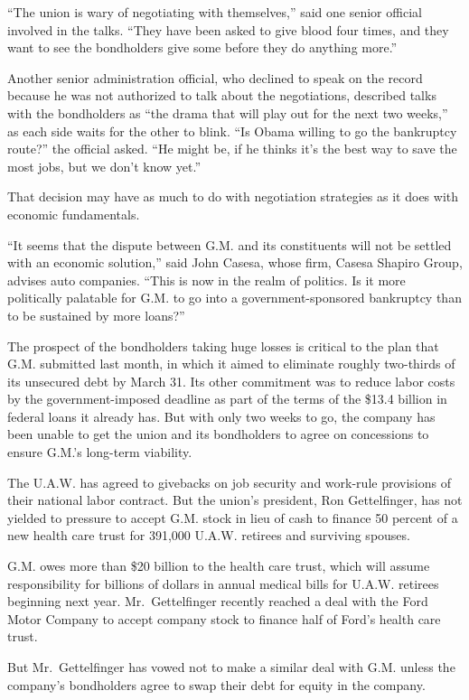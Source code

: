 \documentclass[12pt,a4paper,onecolumn]{article}
\begin{document}
\begin{CJK*}{GBK}{song}
``The union is wary of negotiating with themselves,'' said one senior official involved in the
talks. ``They have been asked to give blood four times, and they want to see the bondholders give
some before they do anything more.''

Another senior administration official, who declined to speak on the record because he was not
authorized to talk about the negotiations, described talks with the bondholders as ``the drama that
will play out for the next two weeks,'' as each side waits for the other to blink. ``Is Obama
willing to go the bankruptcy route?'' the official asked. ``He might be, if he thinks it's the best
way to save the most jobs, but we don't know yet.''

That decision may have as much to do with negotiation strategies as it does with economic
fundamentals.

``It seems that the dispute between G.M. and its constituents will not be settled with an economic
solution,'' said John Casesa, whose firm, Casesa Shapiro Group, advises auto companies. ``This is
now in the realm of politics. Is it more politically palatable for G.M. to go into a
government-sponsored bankruptcy than to be sustained by more loans?''

The prospect of the bondholders taking huge losses is critical to the plan that G.M. submitted last
month, in which it aimed to eliminate roughly two-thirds of its unsecured debt by March 31. Its
other commitment was to reduce labor costs by the government-imposed deadline as part of the terms
of the \$13.4 billion in federal loans it already has. But with only two weeks to go, the company
has been unable to get the union and its bondholders to agree on concessions to ensure G.M.'s
long-term viability.

The U.A.W. has agreed to givebacks on job security and work-rule provisions of their national labor
contract. But the union's president, Ron Gettelfinger, has not yielded to pressure to accept G.M.
stock in lieu of cash to finance 50 percent of a new health care trust for 391,000 U.A.W. retirees
and surviving spouses.

G.M. owes more than \$20 billion to the health care trust, which will assume responsibility for
billions of dollars in annual medical bills for U.A.W. retirees beginning next year.
Mr.~Gettelfinger recently reached a deal with the Ford Motor Company to accept company stock to
finance half of Ford's health care trust.

But Mr.~Gettelfinger has vowed not to make a similar deal with G.M. unless the company's bondholders
agree to swap their debt for equity in the company.


\end{CJK*}
\end{document}
